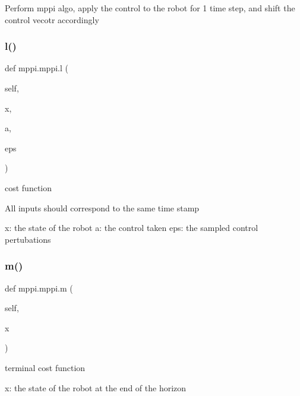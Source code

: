 \begin{DoxyVerb}Perform mppi algo, apply the control to the robot for 1 time step, and shift the control vecotr accordingly
\end{DoxyVerb}
 \mbox{\label{classmppi_1_1mppi_afb42580c212d2f8b3a91769c310b2a59}} 
\subsubsection{\texorpdfstring{l()}{l()}}
{\footnotesize\ttfamily def mppi.\+mppi.\+l (\begin{DoxyParamCaption}\item[{}]{self,  }\item[{}]{x,  }\item[{}]{a,  }\item[{}]{eps }\end{DoxyParamCaption})}

\begin{DoxyVerb}cost function

All inputs should correspond to the same time stamp

x: the state of the robot
a: the control taken
eps: the sampled control pertubations
\end{DoxyVerb}
 \mbox{\label{classmppi_1_1mppi_a4ef334166e9f0a70c4e1f10b4e09ec19}} 
\subsubsection{\texorpdfstring{m()}{m()}}
{\footnotesize\ttfamily def mppi.\+mppi.\+m (\begin{DoxyParamCaption}\item[{}]{self,  }\item[{}]{x }\end{DoxyParamCaption})}

\begin{DoxyVerb}terminal cost function

x: the state of the robot at the end of the horizon
\end{DoxyVerb}
 \mbox{\label{classmppi_1_1mppi_aa571b7cb2b4733b126a35029c1a0ee48}} 
